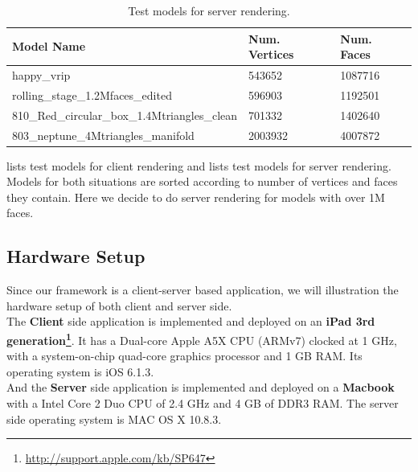 \begin{table}
\begin{center}
    \begin{tabular}{|	p{7.5cm}	|	l	|	l	|}
    \hline	
    	\textbf{Model Name} 						& \textbf{Num. Vertices} 	& \textbf{Num. Faces}	\\ \hline
    	happy\_vrip							&543652			&1087716		\\ \hline
	rolling\_stage\_1.2Mfaces\_edited			&596903			&1192501		\\ \hline
	810\_Red\_circular\_box\_1.4Mtriangles\_clean	&701332			&1402640		\\ \hline
	803\_neptune\_4Mtriangles\_manifold		&2003932			&4007872		\\ \hline
    \end{tabular}
    \caption{Test models for server rendering.}
    \label{table:modelsserverrendering}
\end{center}
\end{table}

 lists test models for client rendering and  lists test models for server rendering. Models for both situations are sorted according to number of vertices and faces they contain. Here we decide to do server rendering for models with over 1M faces. 

\subsection{Hardware Setup}
Since our framework is a client-server based application, we will illustration the hardware setup of both client and server side. \\

The \textbf{Client} side application is implemented and deployed on an \textbf{iPad 3rd generation\footnote{\label{ipad3rd}\url{http://support.apple.com/kb/SP647}}}. It has a Dual-core Apple A5X CPU (ARMv7) clocked at 1 GHz, with a system-on-chip quad-core graphics processor and 1 GB RAM. Its operating system is iOS 6.1.3. \\

And the \textbf{Server} side application is implemented and deployed on a \textbf{Macbook} with a Intel Core 2 Duo CPU of 2.4 GHz and 4 GB of DDR3 RAM. The server side operating system is MAC OS X 10.8.3. \\

